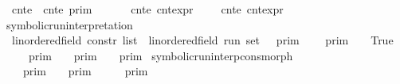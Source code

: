 \begin{isabellebody}
{\isacharbar}\ {\isacartoucheopen}{\isasymlbrakk}\ cnt{\isacharunderscore}e\ {\isasympreceq}\ cnt{\isacharunderscore}e\ {\isasymrbrakk}\isactrlsub p\isactrlsub r\isactrlsub i\isactrlsub m\ {\isacharequal}\ {\isacharbraceleft}\ {\isasymrho}{\isachardot}\ {\isasymlbrakk}\ {\isasymrho}\ {\isasymturnstile}\ cnt{\isacharunderscore}e\ {\isasymrbrakk}\isactrlsub c\isactrlsub n\isactrlsub t\isactrlsub e\isactrlsub x\isactrlsub p\isactrlsub r\ {\isasymle}\ {\isasymlbrakk}\ {\isasymrho}\ {\isasymturnstile}\ cnt{\isacharunderscore}e\ {\isasymrbrakk}\isactrlsub c\isactrlsub n\isactrlsub t\isactrlsub e\isactrlsub x\isactrlsub p\isactrlsub r\ {\isacharbraceright}{\isacartoucheclose}\isanewline
\isanewline
{}\isamarkupfalse%
\ symbolic{\isacharunderscore}run{\isacharunderscore}interpretation\isanewline
\ \ {\isacharcolon}{\isacharcolon}{\isacartoucheopen}{\isacharparenleft}{\isacharprime}{\isasymtau}{\isacharcolon}{\isacharcolon}linordered{\isacharunderscore}field{\isacharparenright}\ constr\ list\ {\isasymRightarrow}\ {\isacharparenleft}{\isacharprime}{\isasymtau}{\isacharcolon}{\isacharcolon}linordered{\isacharunderscore}field{\isacharparenright}\ run\ set{\isacartoucheclose}\ {\isacharparenleft}{\isachardoublequoteopen}{\isasymlbrakk}{\isasymlbrakk}\ {\isacharunderscore}\ {\isasymrbrakk}{\isasymrbrakk}\isactrlsub p\isactrlsub r\isactrlsub i\isactrlsub m{\isachardoublequoteclose}{\isacharparenright}\isanewline
{}\isanewline
\ \ {\isacartoucheopen}{\isasymlbrakk}{\isasymlbrakk}\ {\isacharbrackleft}{\isacharbrackright}\ {\isasymrbrakk}{\isasymrbrakk}\isactrlsub p\isactrlsub r\isactrlsub i\isactrlsub m\ {\isacharequal}\ {\isacharbraceleft}\ {\isacharunderscore}{\isachardot}\ True\ {\isacharbraceright}{\isacartoucheclose}\isanewline
{\isacharbar}\ {\isacartoucheopen}{\isasymlbrakk}{\isasymlbrakk}\ {\isasymgamma}\ {\isacharhash}\ {\isasymGamma}\ {\isasymrbrakk}{\isasymrbrakk}\isactrlsub p\isactrlsub r\isactrlsub i\isactrlsub m\ {\isacharequal}\ {\isasymlbrakk}\ {\isasymgamma}\ {\isasymrbrakk}\isactrlsub p\isactrlsub r\isactrlsub i\isactrlsub m\ {\isasyminter}\ {\isasymlbrakk}{\isasymlbrakk}\ {\isasymGamma}\ {\isasymrbrakk}{\isasymrbrakk}\isactrlsub p\isactrlsub r\isactrlsub i\isactrlsub m{\isacartoucheclose}\isanewline
\isanewline
{}\isamarkupfalse%
\ symbolic{\isacharunderscore}run{\isacharunderscore}interp{\isacharunderscore}cons{\isacharunderscore}morph{\isacharcolon}\isanewline
\ \ {\isacartoucheopen}{\isasymlbrakk}\ {\isasymgamma}\ {\isasymrbrakk}\isactrlsub p\isactrlsub r\isactrlsub i\isactrlsub m\ {\isasyminter}\ {\isasymlbrakk}{\isasymlbrakk}\ {\isasymGamma}\ {\isasymrbrakk}{\isasymrbrakk}\isactrlsub p\isactrlsub r\isactrlsub i\isactrlsub m\ {\isacharequal}\ {\isasymlbrakk}{\isasymlbrakk}\ {\isasymgamma}\ {\isacharhash}\ {\isasymGamma}\ {\isasymrbrakk}{\isasymrbrakk}\isactrlsub p\isactrlsub r\isactrlsub i\isactrlsub m{\isacartoucheclose}\isanewline

\end{isabellebody}

